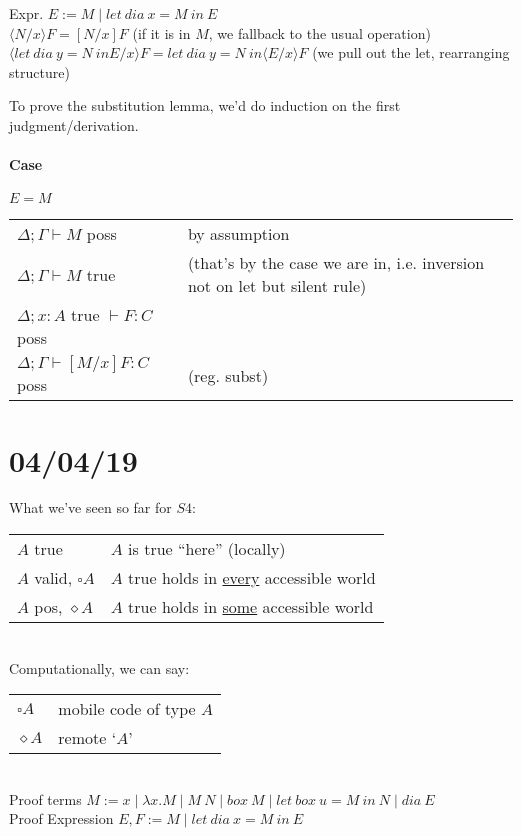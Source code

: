\documentclass[12 pt]{article}
\begin{document}
      Expr. $E := M \mid let\ dia\ x = M\ in\ E$
      \\ $\langle N/x \rangle F = [N/x] F$ (if it is in $M$, we
      fallback to the usual operation)
      \\ $\langle let\ dia\ y = N\ in E /x \rangle F = let\ dia\ y =
      N\ in \langle E/x \rangle F$ (we pull out the let, rearranging
      structure)

      To prove the substitution lemma, we'd do induction on the first
      judgment/derivation.
      \paragraph{Case} $E = M$
      \\
      \begin{tabular}{l l}
        $\Delta; \Gamma \vdash M$ poss& by assumption
        \\ $\Delta; \Gamma \vdash M$ true & (that's by the case we are in, i.e. inversion not on let but silent rule)
        \\ $\Delta; x : A$ true $\vdash F : C$ poss
        \\ $\Delta; \Gamma \vdash [M/x] F : C$ poss & (reg. subst)
      \end{tabular}
      \section{04/04/19}
      What we've seen so far for $S4$:
      \\
      \begin{tabular}{l l}
        $A$ true& $A$ is true ``here'' (locally)
        \\ $A$ valid, $\square A$ & $A$ true holds in \underline{every} accessible world
        \\ $A$ pos, $\diamond A$ & $A$ true holds in \underline{some} accessible world
      \end{tabular}
      \\ Computationally, we can say:
      \\\begin{tabular}{l l}
          $\square A$& mobile code of type $A$
          \\ $\diamond A$ & remote `$A$'
        \end{tabular}
        \\ Proof terms $M := x \mid \lambda x. M \mid M\ N \mid box\
        M \mid let\ box\ u = M\ in\ N\mid dia\ E$
        \\ Proof Expression $E, F:= M \mid let\ dia\ x = M\ in\ E$
\end{document}
